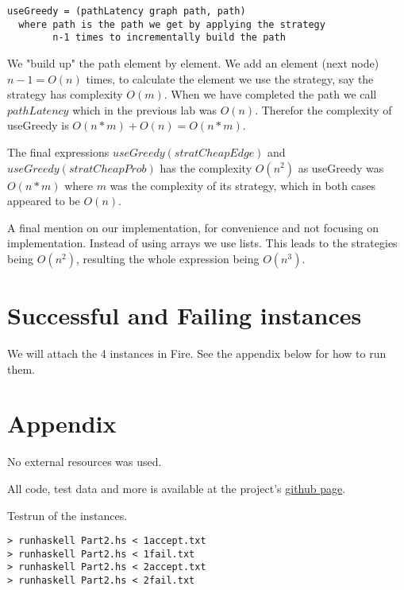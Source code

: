 \documentclass[a4paper,11pt]{article}
\begin{document}
\begin{lstlisting}[mathescape]
useGreedy = (pathLatency graph path, path)
  where path is the path we get by applying the strategy
        n-1 times to incrementally build the path
\end{lstlisting}
We "build up" the path element by element. We add an
element (next node) $n-1=O(n)$ times, to calculate the
element we use the strategy, say the strategy has complexity $O(m)$.
When we have completed the path we call $pathLatency$ which in
the previous lab was $O(n)$. Therefor the complexity of
useGreedy is $O(n*m) + O(n) = O(n*m)$.

The final expressions $useGreedy(stratCheapEdge)$ and
$useGreedy(stratCheapProb)$ has the complexity $O(n^2)$
as useGreedy was $O(n*m)$ where $m$ was the complexity
of its strategy, which in both cases appeared to be
$O(n)$.

A final mention on our implementation, for convenience and
not focusing on implementation. Instead of using arrays
we use lists. This leads to the strategies
being $O(n^2)$, resulting the whole expression being $O(n^3)$.

\section{Successful and Failing instances}

We will attach the 4 instances in Fire.
See the appendix below for how to run them.

\section{Appendix}
No external resources was used.

All code, test data and more is available at the project's \href{https://github.com/bisforboman/Algorithms-TIN092}{github page}.

Testrun of the instances.

\begin{lstlisting}
> runhaskell Part2.hs < 1accept.txt
> runhaskell Part2.hs < 1fail.txt
> runhaskell Part2.hs < 2accept.txt
> runhaskell Part2.hs < 2fail.txt

\end{lstlisting}
\end{document}
